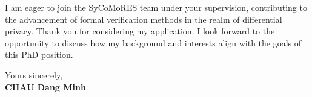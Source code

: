 \documentclass[11pt]{report}
\begin{document}
\begin{titlepage}
    I am eager to join the SyCoMoRES team under your supervision, contributing to the advancement of formal verification methods in the realm of differential privacy. Thank you for considering my application. I look forward to the opportunity to discuss how my background and interests align with the goals of this PhD position.

    \vspace{0.7em}

    Yours sincerely,\\
    \textbf{CHAU Dang Minh}

\end{titlepage}
\end{document}
